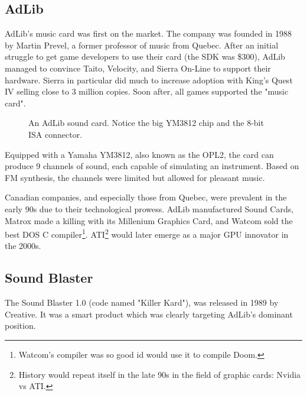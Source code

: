 \documentclass[book.tex]{subfiles}
\begin{document}
 \subsection{AdLib}
  AdLib's music card was first on the market. The company was founded in 1988 by Martin Prevel, a former professor of music from Quebec. After an initial struggle to get game developers to use their card (the SDK was \$300), AdLib managed to convince Taito, Velocity, and Sierra On-Line to support their hardware. Sierra in particular did much to increase adoption with King's Quest IV selling close to 3 million copies. Soon after, all games supported the "music card".\\
  \par

  \begin{figure}[H] 
    \centering 
    \caption{An AdLib sound card. Notice the big YM3812 chip and the 8-bit ISA connector.}
  \end{figure}
   \par
      Equipped with a Yamaha YM3812, also known as the OPL2, the card can produce 9 channels of sound, each capable of simulating an instrument. Based on FM synthesis, the channels were limited but allowed for pleasant music.\\
\par
{} Canadian companies, and especially those from Quebec, were prevalent in the early 90s due to their technological prowess. AdLib manufactured Sound Cards, Matrox made a killing with its Millenium Graphics Card, and Watcom sold the best DOS C compiler\footnote{Watcom's compiler was so good id would use it to compile Doom.}. ATI\footnote{History would repeat itself in the late 90s in the field of graphic cards: Nvidia vs ATI.} would later emerge as a major GPU innovator in the 2000s.\\
  
  


  \subsection{Sound Blaster}
  The Sound Blaster 1.0 (code named "Killer Kard"), was released in 1989 by Creative. It was a smart product which was clearly targeting AdLib's dominant position.\\ 
\par
\end{document}
